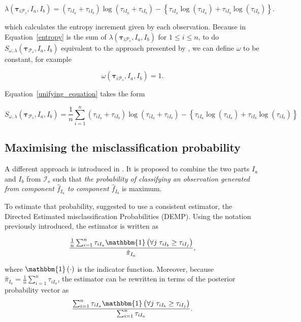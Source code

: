 \documentclass[10pt, a4paper]{article}
\newcommand{\m}[1]{\boldsymbol{#1}}
\begin{document}
\begin{spacing}{1.9}
\[
\lambda(\m\tau_{i \mathcal{P}_s},  I_a,  I_b) =  (\tau_{iI_a}+\tau_{iI_b}) \log(\tau_{iI_a} + \tau_{iI_b}) - \left\{ \tau_{iI_a} \log(\tau_{iI_a}) + \tau_{iI_b} \log(\tau_{iI_b}) \right\}.
\]

which calculates the entropy increment given by each observation. Because in Equation~\ref{entropy} is the sum of $\lambda(\m\tau_{i \mathcal{P}_s},  I_a,  I_b)$ for $1 \leq i \leq n$, to do $S_{\omega, \lambda}( \m\tau_{\mathcal{P}_s},  I_a,  I_b) $ equivalent to the approach presented by \cite{baudry2010combining}, we can define $\omega$ to be constant, for example 

\[
\omega(\m\tau_{i \mathcal{P}_s},  I_a,  I_b) = 1.
\]

Equation~\ref{unifying_equation} takes the form

\[
S_{\omega, \lambda}( \m\tau_{\mathcal{P}_s},  I_a,  I_b) = \frac{1}{n} \sum_{i=1}^n (\tau_{iI_a}+\tau_{iI_b}) \log(\tau_{iI_a} + \tau_{iI_b}) - \left\{ \tau_{iI_a} \log(\tau_{iI_a}) + \tau_{iI_b} \log(\tau_{iI_b}) \right\}
\]


\subsection{Maximising the misclassification probability}
\label{missclassification_section}

A different approach is introduced in \cite{hennig2010methods}. It is proposed to combine the two parts $I_a$ and $I_b$ from $ \mathcal{I}_s$ such that \emph{the probability of classifying an observation generated from component $\hat{f}_{I_a}$ to component $\hat{f}_{I_b}$} is maximum.

To estimate that probability,  \cite{hennig2010methods} suggested to use a consistent estimator, the Directed Estimated misclassification Probabilities (DEMP). Using the notation previously introduced, the estimator is written as

\[
\frac{ \frac{1}{n} \sum_{i=1}^n {\tau_{iI_a} \mathbbm{1}\left( \forall j\; \tau_{i I_{b}} \geq \tau_{iI_j} \right)}}{ \hat{\pi}_{I_a}},
\]

where $\mathbbm{1}\left( \cdot \right)$ is the indicator function. Moreover, because $ \hat{\pi}_{I_a} = \frac{1}{n} \sum_{i=1}^n \tau_{iI_a}$, the estimator can be rewritten in terms of the posterior probability vector as
\begin{equation}\label{demp_criteria}
\frac{ \sum_{i=1}^n {\tau_{iI_a} \mathbbm{1}\left( \forall j\; \tau_{i I_{b}} \geq \tau_{iI_j} \right)}}{\sum_{i=1}^n \tau_{iI_a} }.
\end{equation}


\end{spacing}
\end{document}
